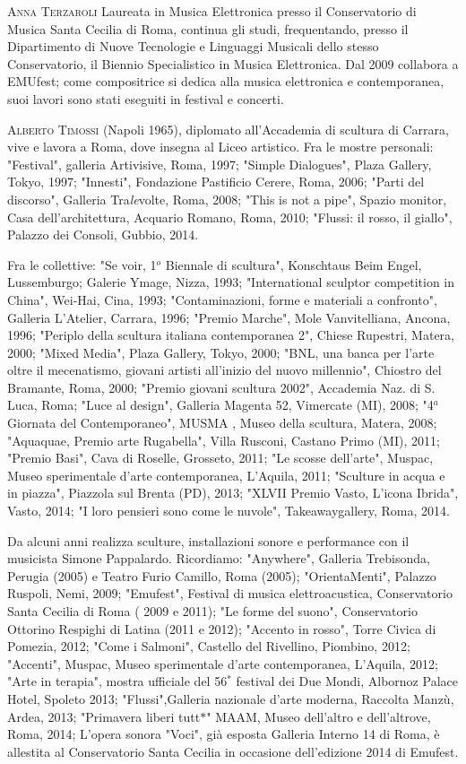 \documentclass[9pt, twoside, a5paper]{extreport}
\newcommand{\biografia}[2]{%
\noindent \textsc{#1} %
#2 %
\medskip
}%
\begin{document}
\begin{multicols}{2}
\biografia{Anna Terzaroli}{Laureata in Musica Elettronica presso il Conservatorio di Musica Santa Cecilia di Roma, continua gli studi, frequentando, presso il Dipartimento di Nuove Tecnologie e Linguaggi Musicali dello stesso Conservatorio, il Biennio Specialistico in Musica Elettronica. Dal 2009 collabora a EMUfest; come compositrice si dedica alla musica elettronica e contemporanea, suoi lavori sono stati eseguiti in festival e concerti.}

\biografia{Alberto Timossi}{(Napoli 1965), diplomato all'Accademia di scultura di Carrara, vive e lavora a Roma, dove insegna al Liceo artistico. 
Fra le mostre personali:
"Festival", galleria Artivisive, Roma, 1997;
"Simple Dialogues", Plaza Gallery, Tokyo, 1997;
"Innesti", Fondazione Pastificio Cerere, Roma, 2006;
"Parti del discorso", Galleria Tra\textit{le}volte, Roma, 2008;
"This is not a pipe", Spazio monitor, Casa dell'architettura, Acquario Romano, Roma, 2010;
"Flussi: il rosso, il giallo", Palazzo dei Consoli, Gubbio, 2014.

Fra le collettive:
"Se voir, 1$^o$ Biennale di scultura", Konschtaus Beim Engel, Lussemburgo; Galerie Ymage, Nizza, 1993;
"International sculptor competition in China", Wei-Hai, Cina, 1993;
"Contaminazioni, forme e materiali a confronto", Galleria L'Atelier, Carrara, 1996;
"Premio Marche", Mole Vanvitelliana, Ancona, 1996; 
"Periplo della scultura italiana contemporanea 2", Chiese Rupestri, Matera, 2000;
"Mixed Media", Plaza Gallery, Tokyo, 2000;
"BNL, una banca per l'arte oltre il mecenatismo, giovani artisti all'inizio del nuovo millennio", Chiostro del
Bramante, Roma, 2000;
"Premio giovani scultura 2002", Accademia Naz. di S. Luca, Roma;
"Luce al design", Galleria Magenta 52, Vimercate (MI), 2008;
"4$^a$ Giornata del Contemporaneo", MUSMA , Museo della scultura, Matera, 2008;
"Aquaquae, Premio arte Rugabella", Villa Rusconi, Castano Primo (MI), 2011;
"Premio Basi", Cava di Roselle, Grosseto, 2011;
"Le scosse dell'arte", Muspac, Museo sperimentale d'arte contemporanea, L'Aquila, 2011;
"Sculture in acqua e in piazza", Piazzola sul Brenta (PD), 2013;
"XLVII Premio Vasto, L'icona Ibrida", Vasto, 2014;
"I loro pensieri sono come le nuvole", Takeawaygallery, Roma, 2014.

Da alcuni anni realizza sculture, installazioni sonore e performance con il musicista Simone Pappalardo. Ricordiamo:
"Anywhere", Galleria Trebisonda, Perugia (2005) e Teatro Furio Camillo, Roma (2005);
"OrientaMenti", Palazzo Ruspoli, Nemi, 2009;
"Emufest", Festival di musica elettroacustica, Conservatorio Santa Cecilia di Roma ( 2009 e 2011);
"Le forme del suono", Conservatorio Ottorino Respighi di Latina (2011 e 2012);
"Accento in rosso", Torre Civica di Pomezia, 2012;
"Come i Salmoni", Castello del Rivellino, Piombino, 2012;
"Accenti", Muspac, Museo sperimentale d'arte contemporanea, L'Aquila, 2012;
"Arte in terapia", mostra ufficiale del 56$^*$ festival dei Due Mondi, Albornoz Palace Hotel, Spoleto 2013;
"Flussi",Galleria nazionale d'arte moderna, Raccolta Manzù, Ardea, 2013;
"Primavera liberi tutt$\ast$" MAAM, Museo dell'altro e dell'altrove, Roma, 2014;
L'opera sonora "Voci", già esposta Galleria Interno 14 di Roma, è allestita al Conservatorio Santa Cecilia in
occasione dell'edizione 2014 di Emufest.}


\end{multicols}
\end{document}

